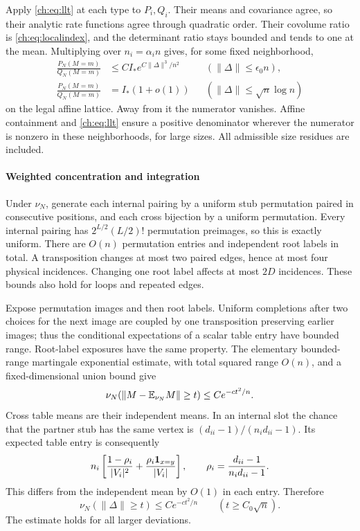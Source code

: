 Apply \eqref{ch:eq:llt} at each type to $P_i,Q_i$. Their means and covariance agree, so their analytic rate functions agree through quadratic order. Their covolume ratio is \eqref{ch:eq:localindex}, and the determinant ratio stays bounded and tends to one at the mean. Multiplying over $n_i=\alpha_i n$ gives, for some fixed neighborhood,
\begin{align}
 \frac{P_N(M=m)}{Q_N(M=m)}&\le C I_*e^{C\|\Delta\|^3/n^2}
 &&(\|\Delta\|\le\epsilon_0n),\label{ch:eq:cubic}\\
 \frac{P_N(M=m)}{Q_N(M=m)}&=I_*(1+o(1))
 &&(\|\Delta\|\le\sqrt n\log n)\label{ch:eq:ratio}
\end{align}
on the legal affine lattice. Away from it the numerator vanishes. Affine containment and \eqref{ch:eq:llt} ensure a positive denominator wherever the numerator is nonzero in these neighborhoods, for large sizes. All admissible size residues are included.

\paragraph{Weighted concentration and integration}
Under $\nu_N$, generate each internal pairing by a uniform stub permutation paired in consecutive positions, and each cross bijection by a uniform permutation. Every internal pairing has $2^{L/2}(L/2)!$ permutation preimages, so this is exactly uniform. There are $O(n)$ permutation entries and independent root labels in total. A transposition changes at most two paired edges, hence at most four physical incidences. Changing one root label affects at most $2D$ incidences. These bounds also hold for loops and repeated edges.

Expose permutation images and then root labels. Uniform completions after two choices for the next image are coupled by one transposition preserving earlier images; thus the conditional expectations of a scalar table entry have bounded range. Root-label exposures have the same property. The elementary bounded-range martingale exponential estimate, with total squared range $O(n)$, and a fixed-dimensional union bound give
\[
 \nu_N(\|M-\mathbb E_{\nu_N}M\|\ge t)\le Ce^{-ct^2/n}.
\]
Cross table means are their independent means. In an internal slot the chance that the partner stub has the same vertex is $(d_{ii}-1)/(n_id_{ii}-1)$. Its expected table entry is consequently
\[
 n_i\left[\frac{1-\rho_i}{|V_i|^2}
       +\frac{\rho_i\mathbf 1_{x=y}}{|V_i|}\right],
 \qquad\rho_i=\frac{d_{ii}-1}{n_id_{ii}-1}.
\]
This differs from the independent mean by $O(1)$ in each entry. Therefore
\begin{equation}\label{ch:eq:tail}
 \nu_N(\|\Delta\|\ge t)\le Ce^{-ct^2/n}\qquad(t\ge C_0\sqrt n).
\end{equation}
The estimate holds for all larger deviations.

